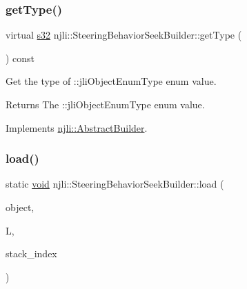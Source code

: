 \mbox{\label{classnjli_1_1_steering_behavior_seek_builder_aed95b1cfbded96558a4d9d884b478af2}} 
\subsubsection{\texorpdfstring{get\+Type()}{getType()}}
{\footnotesize\ttfamily virtual \mbox{\hyperlink{_util_8h_aa62c75d314a0d1f37f79c4b73b2292e2}{s32}} njli\+::\+Steering\+Behavior\+Seek\+Builder\+::get\+Type (\begin{DoxyParamCaption}{ }\end{DoxyParamCaption}) const\hspace{0.3cm}{\ttfamily [virtual]}}

Get the type of \+::jli\+Object\+Enum\+Type enum value.

\begin{DoxyReturn}{Returns}
The \+::jli\+Object\+Enum\+Type enum value. 
\end{DoxyReturn}


Implements \mbox{\hyperlink{classnjli_1_1_abstract_builder_abb4a8161cd71be12807fe85864b67050}{njli\+::\+Abstract\+Builder}}.

\mbox{\label{classnjli_1_1_steering_behavior_seek_builder_a4656eb59c3684a9a2294f58c2b75c0c9}} 
\subsubsection{\texorpdfstring{load()}{load()}}
{\footnotesize\ttfamily static \mbox{\hyperlink{_thread_8h_af1e856da2e658414cb2456cb6f7ebc66}{void}} njli\+::\+Steering\+Behavior\+Seek\+Builder\+::load (\begin{DoxyParamCaption}\item[{\mbox{\hyperlink{classnjli_1_1_steering_behavior_seek_builder}{Steering\+Behavior\+Seek\+Builder}} \&}]{object,  }\item[{lua\+\_\+\+State $\ast$}]{L,  }\item[{int}]{stack\+\_\+index }\end{DoxyParamCaption})\hspace{0.3cm}{\ttfamily [static]}}


